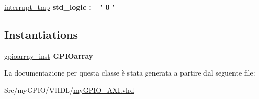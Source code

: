 \begin{DoxyCompactItemize}
\item 
\hypertarget{classmy_g_p_i_o___a_x_i_1_1arch__imp_gad7f656c91324519f1ad5d25d903037b1}{\hyperlink{group___a_x_i-internal_gad7f656c91324519f1ad5d25d903037b1}{interrupt\+\_\+tmp} {\bfseries \textcolor{vhdlchar}{std\+\_\+logic}\textcolor{vhdlchar}{ }\textcolor{vhdlchar}{ }\textcolor{vhdlchar}{\+:}\textcolor{vhdlchar}{=}\textcolor{vhdlchar}{ }\textcolor{vhdlchar}{ }\textcolor{vhdlchar}{'}\textcolor{vhdlchar}{ } \textcolor{vhdldigit}{0} \textcolor{vhdlchar}{ }\textcolor{vhdlchar}{'}\textcolor{vhdlchar}{ }} }\label{classmy_g_p_i_o___a_x_i_1_1arch__imp_gad7f656c91324519f1ad5d25d903037b1}

\end{DoxyCompactItemize}
\subsection*{Instantiations}
 \begin{DoxyCompactItemize}
\item 
\hypertarget{classmy_g_p_i_o___a_x_i_1_1arch__imp_aa9405ada469e1caaeffbfe0b4d9c061e}{\hyperlink{classmy_g_p_i_o___a_x_i_1_1arch__imp_aa9405ada469e1caaeffbfe0b4d9c061e}{gpioarray\+\_\+inst}  {\bfseries G\+P\+I\+Oarray}   }\label{classmy_g_p_i_o___a_x_i_1_1arch__imp_aa9405ada469e1caaeffbfe0b4d9c061e}

\end{DoxyCompactItemize}


La documentazione per questa classe è stata generata a partire dal seguente file\+:\begin{DoxyCompactItemize}
\item 
Src/my\+G\+P\+I\+O/\+V\+H\+D\+L/\hyperlink{my_g_p_i_o___a_x_i_8vhd}{my\+G\+P\+I\+O\+\_\+\+A\+X\+I.\+vhd}\end{DoxyCompactItemize}
